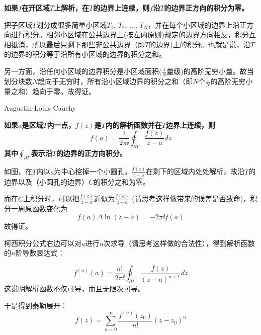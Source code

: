 \documentclass[CJK]{beamer}
\begin{document}
\begin{frame}
  \bch
 {\bf \blue 如果$f$在开区域$T$上解析，在$T$的边界上连续，则$f$沿$T$的边界正方向的积分为零。}

 把子区域$T$划分成很多简单小区域$T_1$, $T_2$, $\ldots$, $T_N$，并在每个小区域的边界上沿正方向进行积分。相邻小区域在公共边界上(按左内原则)规定的边界方向相反，积分互相抵消，所以最后只剩下那些非公共边界（即$T$的边界)上的积分。也就是说，沿$T$的边界的积分等于沿所有小区域的边界的积分之和。

   \emini
   另一方面，沿任何小区域的边界积分是小区域面积($\frac{1}{N}$量级)的高阶无穷小量。故当划分块数$N$趋向于无穷时，所有沿小区域边界的积分之和（即$N$个$\frac{1}{N}$的高阶无穷小量之和）趋向于零。故得证。
   \emini
  \ech
\end{frame}

\begin{frame}
  \bch
  \bcenter

  Augustin-Louis Cauchy
  \ecenter
  \ech
\end{frame}

\begin{frame}
  \bch
      {\bf \blue 如果$a$是区域$T$内一点，$f(z)$是$T$内的解析函数并在$T$边界上连续，则
        $$ f(a) = \frac{1}{2\pi \ii}\oint_{\partial T} \frac{f(z)}{z-a} dz $$
        其中$\oint_{\partial T}$表示沿$T$的边界的正方向积分。}

      \emini
      如图，在$T$内以$a$为中心挖掉一个小圆孔。$\frac{f(z)}{z-a}$在剩下的区域内处处解析，故沿$T$的边界以及（小圆孔的边界）$C$的积分之和为零。

      而在$C$上积分时，可以把$\frac{f(z)}{z-a}$近似为$\frac{f(a)}{z-a}$ (请思考这样做带来的误差是否致命)，积分一周原函数变化为
      $$f(a)\Delta\ln(z-a)  = -2\pi \ii f(a)$$
      故得证。
      \emini
  \ech
\end{frame}

\begin{frame}
  \bch
  柯西积分公式右边可以对$a$进行$n$次求导（请思考这样做的合法性），得到解析函数的$n$阶导数表达式：

  {\blue
        $$f^{(n)}(a) = \frac{n!}{2\pi \ii}\oint_{\partial T} \frac{f(z)}{(z-a)^{n+1}} dz$$    
  }
  这说明解析函数不仅可导，而且无限次可导。

  于是得到泰勒展开：
  $$f(z) = \sum_{n=0}^\infty \frac{f^{(n)}(z_0)}{n!} (z-z_0)^n$$
  \ech
\end{frame}
\end{document}
